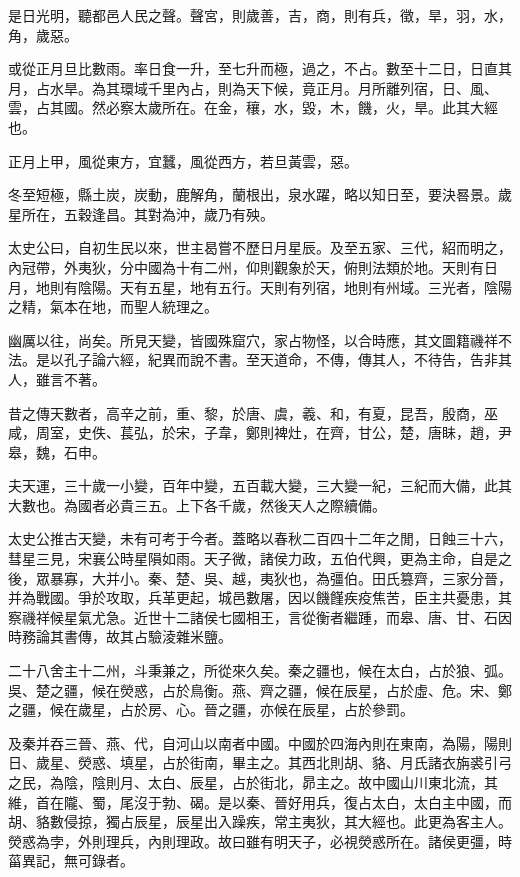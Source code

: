 是日光明，聽都邑人民之聲。聲宮，則歲善，吉，商，則有兵，徵，旱，羽，水，角，歲惡。

或從正月旦比數雨。率日食一升，至七升而極，過之，不占。數至十二日，日直其月，占水旱。為其環域千里內占，則為天下候，竟正月。月所離列宿，日、風、雲，占其國。然必察太歲所在。在金，穰，水，毀，木，饑，火，旱。此其大經也。

正月上甲，風從東方，宜蠶，風從西方，若旦黃雲，惡。

冬至短極，縣土炭，炭動，鹿解角，蘭根出，泉水躍，略以知日至，要決晷景。歲星所在，五穀逢昌。其對為沖，歲乃有殃。

太史公曰，自初生民以來，世主曷嘗不歷日月星辰。及至五家、三代，紹而明之，內冠帶，外夷狄，分中國為十有二州，仰則觀象於天，俯則法類於地。天則有日月，地則有陰陽。天有五星，地有五行。天則有列宿，地則有州域。三光者，陰陽之精，氣本在地，而聖人統理之。

幽厲以往，尚矣。所見天變，皆國殊窟穴，家占物怪，以合時應，其文圖籍禨祥不法。是以孔子論六經，紀異而說不書。至天道命，不傳，傳其人，不待告，告非其人，雖言不著。

昔之傳天數者，高辛之前，重、黎，於唐、虞，羲、和，有夏，昆吾，殷商，巫咸，周室，史佚、萇弘，於宋，子韋，鄭則裨灶，在齊，甘公，楚，唐眛，趙，尹皋，魏，石申。

夫天運，三十歲一小變，百年中變，五百載大變，三大變一紀，三紀而大備，此其大數也。為國者必貴三五。上下各千歲，然後天人之際續備。

太史公推古天變，未有可考于今者。蓋略以春秋二百四十二年之閒，日蝕三十六，彗星三見，宋襄公時星隕如雨。天子微，諸侯力政，五伯代興，更為主命，自是之後，眾暴寡，大并小。秦、楚、吳、越，夷狄也，為彊伯。田氏篡齊，三家分晉，并為戰國。爭於攻取，兵革更起，城邑數屠，因以饑饉疾疫焦苦，臣主共憂患，其察禨祥候星氣尤急。近世十二諸侯七國相王，言從衡者繼踵，而皋、唐、甘、石因時務論其書傳，故其占驗淩雜米鹽。

二十八舍主十二州，斗秉兼之，所從來久矣。秦之疆也，候在太白，占於狼、弧。吳、楚之疆，候在熒惑，占於鳥衡。燕、齊之疆，候在辰星，占於虛、危。宋、鄭之疆，候在歲星，占於房、心。晉之疆，亦候在辰星，占於參罰。

及秦并吞三晉、燕、代，自河山以南者中國。中國於四海內則在東南，為陽，陽則日、歲星、熒惑、填星，占於街南，畢主之。其西北則胡、貉、月氏諸衣旃裘引弓之民，為陰，陰則月、太白、辰星，占於街北，昴主之。故中國山川東北流，其維，首在隴、蜀，尾沒于勃、碣。是以秦、晉好用兵，復占太白，太白主中國，而胡、貉數侵掠，獨占辰星，辰星出入躁疾，常主夷狄，其大經也。此更為客主人。熒惑為孛，外則理兵，內則理政。故曰雖有明天子，必視熒惑所在。諸侯更彊，時菑異記，無可錄者。

